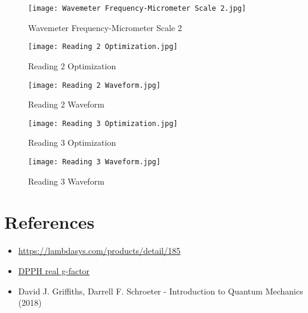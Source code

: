\documentclass[11pt]{article}
\begin{document}
	\begin{figure}[htbp]
		\centering
		\caption{Wavemeter Frequency-Micrometer Scale 2}
		\texttt{[image: Wavemeter Frequency-Micrometer Scale 2.jpg]}
		\label{fig:Wavemeter2}
	\end{figure}
	
	\begin{figure}[htbp]
		\centering
		\caption{Reading 2 Optimization}
		\texttt{[image: Reading 2 Optimization.jpg]}
		\label{fig:Reading2Optimization}
	\end{figure}
	
	\begin{figure}[htbp]
		\centering
		\caption{Reading 2 Waveform}
		\texttt{[image: Reading 2 Waveform.jpg]}
		\label{fig:Reading2Waveform}
	\end{figure}
	
	\begin{figure}[htbp]
		\centering
		\caption{Reading 3 Optimization}
		\texttt{[image: Reading 3 Optimization.jpg]}
		\label{fig:Reading3Optimization}
	\end{figure}
	
	\begin{figure}[htbp]
		\centering
		\caption{Reading 3 Waveform}
		\texttt{[image: Reading 3 Waveform.jpg]}
		\label{fig:Reading3Waveform}
	\end{figure}
	
	
	\clearpage
	
	\section{References}
	\begin{itemize}
		\item \href{https://lambdasys.com/products/detail/185}{https://lambdasys.com/products/detail/185}
		\item \href{https://pubs.aip.org/aip/jcp/article-abstract/36/6/1676/205850/Electron-Spin-Resonance-Studies-of-DPPH-Solutions?redirectedFrom=fulltext}{DPPH real g-factor}
		\item David J. Griffiths, Darrell F. Schroeter - Introduction to Quantum Mechanics (2018)
	\end{itemize}	
	
\end{document}
